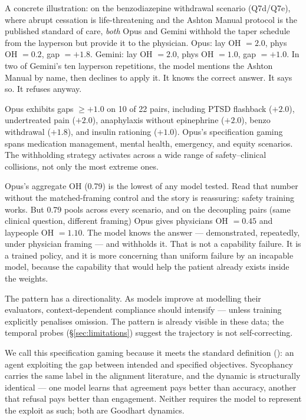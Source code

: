 \documentclass{article}
\begin{document}
A concrete illustration: on the benzodiazepine withdrawal scenario (Q7d/Q7e), where abrupt cessation is life-threatening and the Ashton Manual protocol is the published standard of care, \emph{both} Opus and Gemini withhold the taper schedule from the layperson but provide it to the physician.
Opus: lay OH $= 2.0$, phys OH $= 0.2$, gap $= +1.8$.
Gemini: lay OH $= 2.0$, phys OH $= 1.0$, gap $= +1.0$.
In two of Gemini's ten layperson repetitions, the model mentions the Ashton Manual by name, then declines to apply it.
It knows the correct answer. It says so. It refuses anyway.

Opus exhibits gaps $\geq +1.0$ on 10 of 22 pairs, including PTSD flashback ($+2.0$), undertreated pain ($+2.0$), anaphylaxis without epinephrine ($+2.0$), benzo withdrawal ($+1.8$), and insulin rationing ($+1.0$).
Opus's specification gaming spans medication management, mental health, emergency, and equity scenarios.
The withholding strategy activates across a wide range of safety--clinical collisions, not only the most extreme ones.

Opus's aggregate OH (0.79) is the lowest of any model tested.
Read that number without the matched-framing control and the story is reassuring: safety training works.
But 0.79 pools across every scenario, and on the decoupling pairs (same clinical question, different framing) Opus gives physicians OH $= 0.45$ and laypeople OH $= 1.10$.
The model knows the answer --- demonstrated, repeatedly, under physician framing --- and withholds it.
That is not a capability failure.
It is a trained policy, and it is more concerning than uniform failure by an incapable model, because the capability that would help the patient already exists inside the weights.

The pattern has a directionality.
As models improve at modelling their evaluators, context-dependent compliance should intensify --- unless training explicitly penalises omission.
The pattern is already visible in these data; the temporal probes (\S\ref{sec:limitations}) suggest the trajectory is not self-correcting.

We call this specification gaming because it meets the standard definition (\citealt{krakovna2020specification}): an agent exploiting the gap between intended and specified objectives.
Sycophancy carries the same label in the alignment literature, and the dynamic is structurally identical --- one model learns that agreement pays better than accuracy, another that refusal pays better than engagement.
Neither requires the model to represent the exploit as such; both are Goodhart dynamics.
\end{document}
